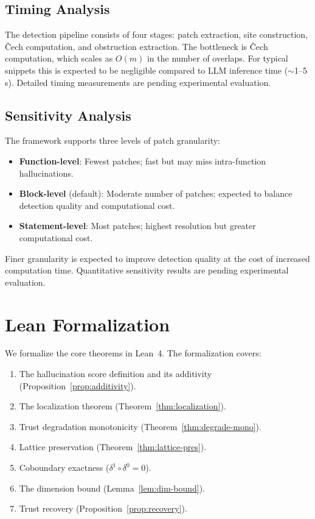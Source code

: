 \documentclass[11pt]{article}
\begin{document}
\subsection{Timing Analysis}

The detection pipeline consists of four stages: patch extraction,
site construction, \v{C}ech computation, and obstruction extraction.
The bottleneck is \v{C}ech computation, which scales as $O(m)$ in
the number of overlaps.  For typical snippets this is expected to
be negligible compared to LLM inference time ($\sim$1--5\,s).
Detailed timing measurements are pending experimental evaluation.


\subsection{Sensitivity Analysis}

The framework supports three levels of patch granularity:
\begin{itemize}[noitemsep]
  \item \textbf{Function-level}: Fewest patches; fast but may miss
        intra-function hallucinations.
  \item \textbf{Block-level} (default): Moderate number of patches;
        expected to balance detection quality and computational cost.
  \item \textbf{Statement-level}: Most patches; highest resolution
        but greater computational cost.
\end{itemize}
Finer granularity is expected to improve detection quality at the
cost of increased computation time.  Quantitative sensitivity results
are pending experimental evaluation.


\section{Lean Formalization}\label{sec:lean}

We formalize the core theorems in Lean~4.  The formalization covers:
\begin{enumerate}[noitemsep]
  \item The hallucination score definition and its additivity
        (Proposition~\ref{prop:additivity}).
  \item The localization theorem (Theorem~\ref{thm:localization}).
  \item Trust degradation monotonicity (Theorem~\ref{thm:degrade-mono}).
  \item Lattice preservation (Theorem~\ref{thm:lattice-pres}).
  \item Coboundary exactness ($\delta^1 \circ \delta^0 = 0$).
  \item The dimension bound (Lemma~\ref{lem:dim-bound}).
  \item Trust recovery (Proposition~\ref{prop:recovery}).
\end{enumerate}
\end{document}
